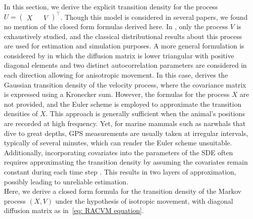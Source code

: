 \documentclass[aoas]{imsart}
\theoremstyle{definition}
\theoremstyle{remark}
\theoremstyle{remark}
\newcommand {\1}{\mathbb{1}}
\begin{document}
In this section, we derive the explicit transition density for the process $U=\begin{pmatrix} X && V \end{pmatrix}^\top$. Though this model is considered in several papers, we found no mention of the closed form formulas derived here. In \cite{gurarie_correlated_2017}, only the process $V$ is exhaustively studied, and the classical distributional results about this process are used for estimation and simulation purposes.
A more general formulation is considered by \cite{albertsen_generalizing_2018} in which the diffusion matrix is lower triangular with positive diagonal elements and two distinct autocorrelation parameters are considered in each direction allowing for anisotropic movement. In this case, \cite{albertsen_generalizing_2018} derives the Gaussian transition density of the velocity process, where the covariance matrix is expressed using a Kronecker sum. However, the formulas for the process $X$
are not provided, and the Euler scheme is employed to approximate the transition densities of $X$. This approach is generally sufficient when the animal’s positions are recorded at high frequency. Yet, for marine mammals such as narwhals that dive to great depths, GPS measurements are usually taken at irregular intervals, typically of several minutes, which can render the Euler scheme unsuitable. Additionally, incorporating covariates into the parameters of the SDE often requires approximating the transition density by assuming the covariates remain constant during each time step \citep{michelot_varying-coefficient_2021}. This results in two layers of approximation, possibly leading to unreliable estimation.\\

Here, we derive a closed form formula for the transition density of the Markov process $(X ,V)$ under the hypothesis of isotropic movement, with diagonal diffusion matrix as in~\eqref{eq: RACVM equation}.\\
\end{document}
